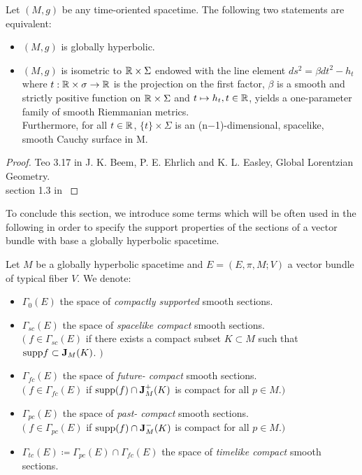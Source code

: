 \documentclass[a4paper,12pt]{scrartcl}    %
\begin{document}
			\begin{theorem}\label{Teo:GHSC_character}
				Let $(M,g)$ be any time-oriented spacetime. The following two statements are equivalent:
				\begin{itemize}
					\item $(M,g)$ is globally hyperbolic.
					\item $(M,g)$ is isometric to $ \mathbb{R} \times \Sigma $ 
						endowed with the line element $ds^2 = \beta dt^2 - h_t$ 
						where $t : \mathbb{R} \times \sigma \rightarrow \mathbb{R}$ is the projection on the first factor, 
						$\beta$ is a smooth and strictly positive function on $\mathbb{R} \times \Sigma$ 
						and $t \mapsto h_t , t \in \mathbb{R}$, yields a one-parameter family of smooth Riemmanian metrics.\\
						Furthermore, for all $t\in \mathbb{R}$, $\{t\}\times \Sigma$ is an (n−1)-dimensional, spacelike, smooth Cauchy surface in M.
				\end{itemize}
			\end{theorem}
			\begin{proof}
				Teo 3.17 in J. K. Beem, P. E. Ehrlich and K. L. Easley, Global Lorentzian Geometry.
				\\
				section 1.3 in \cite{barwav}
			\end{proof}

		To conclude this section, we introduce some terms which will be often used in the following in order to
specify the support properties of the sections of a vector bundle with base a globally hyperbolic spacetime.
		\begin{notationfix}
		Let $M$ be a globally hyperbolic spacetime and $E=(E,\pi,M;V)$ a vector bundle of typical fiber $V$.
		We denote:
		\begin{itemize}
			\item $\Gamma_0(E)$ the space of \emph{compactly supported} smooth sections.
			\item $\Gamma_{sc}(E)$  the space of \emph{spacelike compact} smooth sections.\\
				$\big(\; f\in \Gamma_{sc}(E)$ if there exists a compact subset $K \subset M$  such that $\textrm{supp} f \subset \mathbf{J}_M(K)$. $\big)$
			\item  $\Gamma_{fc}(E) $ the space of \emph{future- compact} smooth sections.\\
				$\big(\; f\in \Gamma_{fc}(E) $ if  $\textrm{supp}(f) \cap  \mathbf{J}^+_M(K)$ is compact for all $p\in M$.$\big)$
			\item  $\Gamma_{pc}(E) $ the space of \emph{past- compact} smooth sections.\\
				$\big(\; f\in \Gamma_{pc}(E) $ if  $\textrm{supp}(f) \cap  \mathbf{J}^-_M(K)$ is compact for all $p\in M$.$\big)$
			\item $\Gamma_{tc}(E) \coloneqq \Gamma_{pc}(E) \cap \Gamma_{fc}(E) $ the space of \emph{timelike compact} smooth sections.
		\end{itemize}
		\end{notationfix}
		
\end{document}
